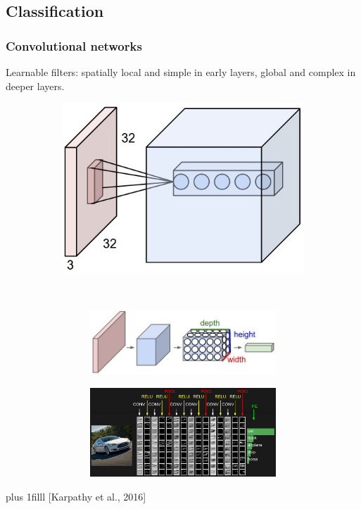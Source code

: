 \documentclass{beamer}
\newcommand{\source}[1]{\vskip0pt plus 1filll \scriptsize #1}
\begin{document}
	\subsection[Classification]{Classification}
	\begin{frame}
		\frametitle{Convolutional networks}
		Learnable filters: spatially local and simple in early layers, global and complex in deeper layers.
		\begin{figure}[h]
			\centering
			\begin{subfigure}{0.4\textwidth}
				\includegraphics[width=\textwidth]{plots/convLayer.jpeg}
			\end{subfigure}
			~
			\begin{subfigure}{0.5\textwidth}
				\begin{subfigure}{\textwidth}
					\includegraphics[width=\textwidth]{plots/convNetVolumes.jpeg}
				\end{subfigure}
				\par \smallskip
				\begin{subfigure}{\textwidth}
					\includegraphics[width=\textwidth]{plots/convNetExample.jpeg}
				\end{subfigure}
			\end{subfigure}
		\end{figure}
		\source{[Karpathy et al., 2016]}
		

\end{frame}
\end{document}
